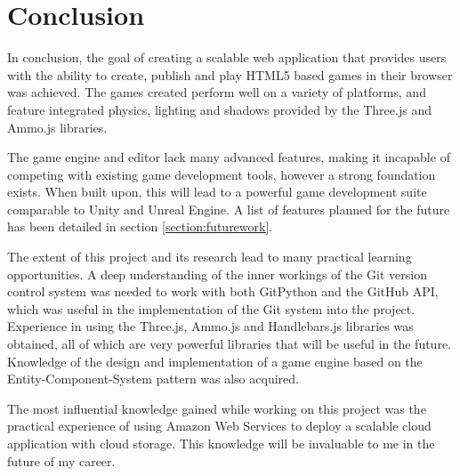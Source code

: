 \chapter{Conclusion}

In conclusion, the goal of creating a scalable web application that provides users with the ability to create, publish and play HTML5 based games in their browser was achieved. The games created perform well on a variety of platforms, and feature integrated physics, lighting and shadows provided by the Three.js and Ammo.js libraries.

The game engine and editor lack many advanced features, making it incapable of competing with existing game development tools, however a strong foundation exists. When built upon, this will lead to a powerful game development suite comparable to Unity and Unreal Engine. A list of features planned for the future has been detailed in section \ref{section:futurework}.

The extent of this project and its research lead to many practical learning opportunities. A deep understanding of the inner workings of the Git version control system was needed to work with both GitPython and the GitHub API, which was useful in the implementation of the Git system into the project. Experience in using the Three.js, Ammo.js and Handlebars.js libraries was obtained, all of which are very powerful libraries that will be useful in the future. Knowledge of the design and implementation of a game engine based on the Entity-Component-System pattern was also acquired.

The most influential knowledge gained while working on this project was the practical experience of using Amazon Web Services to deploy a scalable cloud application with cloud storage. This knowledge will be invaluable to me in the future of my career.
